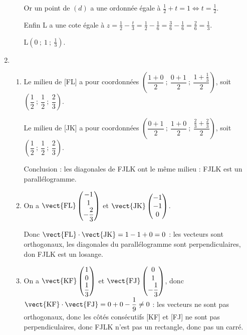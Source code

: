 \begin{enumerate}
\begin{enumerate}
Or un point de $(d)$ a une ordonnée égale à $\frac{1}{2} + t = 1 \iff t = \frac{1}{2} $.

Enfin L a une cote égale à $z = \frac{1}{2} - \frac{t}{3} = \frac{1}{2} - \frac{1}{6}  = \frac{3}{6} - \frac{1}{6} = \frac{2}{6} = \frac{1}{3}$.

L$\left(0~;~1~;~ \frac{1}{3}\right)$.
	\end{enumerate}
\item
	\begin{enumerate}
		\item %
Le milieu de [FL] a pour coordonnées $\left(\dfrac{1 + 0}{2}~;~\dfrac{0 + 1}{2}~;~\dfrac{1 + \frac{1}{3}}{2} \right)$, soit $\left(\dfrac{1}{2}~;~\dfrac{1}{2}~;~\dfrac{2}{3} \right)$.

Le milieu de [JK] a pour coordonnées $\left(\dfrac{0 + 1}{2}~;~\dfrac{1 + 0}{2}~;~\dfrac{\frac{2}{3} + \frac{2}{3}}{2} \right)$, soit $\left(\dfrac{1}{2}~;~\dfrac{1}{2}~;~\dfrac{2}{3} \right)$.

Conclusion : les diagonales de FJLK ont le même milieu : FJLK est un parallélogramme.
		\item %
		On a $\vect{\text{FL}}\begin{pmatrix}-1\\1\\- \dfrac{2}{3}\end{pmatrix}$ et  $\vect{\text{JK}}\begin{pmatrix}-1\\-1\\ 0\end{pmatrix}$.
	
	Donc $\vect{\text{FL}} \cdot \vect{\text{JK}} = 1 - 1 + 0 = 0$ : les vecteurs sont orthogonaux, les diagonales du parallélogramme sont perpendiculaires, don FJLK est un losange.
		\item %
		On a $\vect{\text{KF}}\begin{pmatrix}1\\0\\\dfrac{1}{3}\end{pmatrix}$ et $\vect{\text{FJ}}\begin{pmatrix}0\\1\\-\dfrac{1}{3}\end{pmatrix}$, donc $\vect{\text{KF}} \cdot \vect{\text{FJ}} = 0 + 0 - \dfrac{1}{9} \ne 0$ : les vecteurs ne sont pas orthogonaux, donc les côtés consécutifs [KF] et [FJ] ne sont pas perpendiculaires, donc FJLK n'est pas un rectangle, donc pas un carré.
	\end{enumerate}
\end{enumerate}

